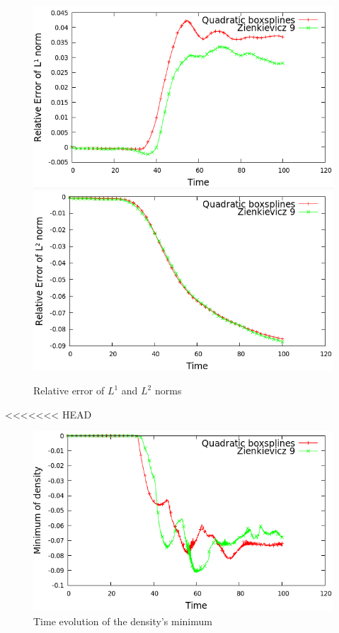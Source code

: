 \documentclass[proc]{edpsmath}
\begin{document}
\begin{figure}[h!]
	\includegraphics[scale=0.3]{figures/l1norm_160.png}
	\includegraphics[scale=0.3]{figures/l2norm_160.png}
	\caption{Relative error of $L^1$ and $L^2$ norms}
\end{figure}


<<<<<<< HEAD
\begin{figure}[h!]
	\includegraphics[scale=0.4]{figures/min_density_160.png}
	\caption{Time evolution of the density's minimum}
\end{figure}
\end{document}
